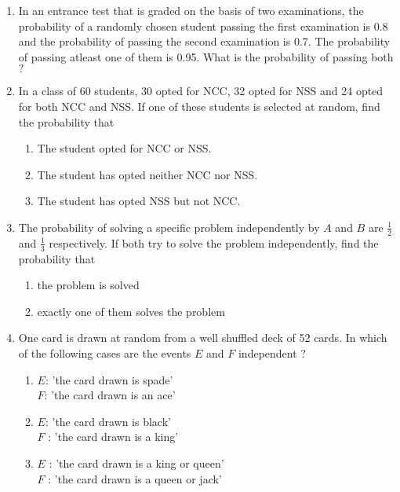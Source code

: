 \begin{enumerate}[label=\thesubsection.\arabic*,ref=\thesubsection.\theenumi,resume*]
	\\
	\solution

\item In an entrance test that is graded on the basis of two examinations, the probability of a randomly chosen student passing the first examination is 0.8 and the probability of passing the second examination is 0.7. The probability of passing atleast one of them is 0.95. What is the probability of passing both$?$
	\\
	\solution

 \item In a class of 60 students, 30 opted for NCC, 32 opted for NSS and 24 
    opted for both NCC and NSS. If one of these students is selected at random, 
    find the probability that
    \begin{enumerate}
        \item The student opted for NCC or NSS.
        \item The student has opted neither NCC nor NSS.
        \item The student has opted NSS but not NCC.
    \end{enumerate}
	\solution

\item The probability of solving a specific problem independently by $A$ and $B$ are $\frac{1}{2}$ and $\frac{1}{3}$ respectively. If both try to solve the problem independently, find the probability that
		\label{ncert/12/13/2/13}
\begin{enumerate}
\item the problem is solved
\item exactly one of them solves the problem
\end{enumerate}
\solution

\item One card is drawn at random from a well shuffled deck of 52 cards. In which of the following cases are the events $E$ and $F$ independent ?
		\label{ncert/12/13/2/14}
\begin{enumerate}
\item $E$: 'the card drawn is spade'\\
$F$: 'the card drawn is an ace'
\item $E$: 'the card drawn is black’\\
$F$ : 'the card drawn is a king’
\item $E$ : 'the card drawn is a king or queen’\\
$F$ : 'the card drawn is a queen or jack’
\end{enumerate}
\solution

\end{enumerate}
